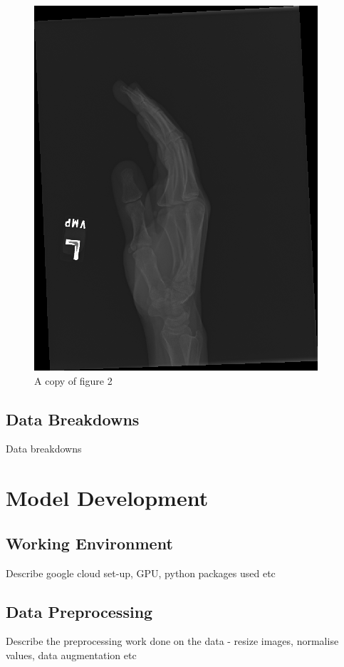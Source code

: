 \documentclass[11pt]{article} %
\theoremstyle{plain}
\theoremstyle{definition}
\begin{document}
\begin{figure}
  \caption{A copy of figure 2}
  \label{fig:xray2_copy}
  \includegraphics[scale=0.5]{image2_copy.png}
\end{figure}
\clearpage
\noindent

\subsection{Data Breakdowns}
Data breakdowns



\newpage
\section{Model Development}

\subsection{Working Environment}
Describe google cloud set-up, GPU, python packages used etc

\subsection{Data Preprocessing}
Describe the preprocessing work done on the data - resize images, normalise values, data augmentation etc 
\end{document}

